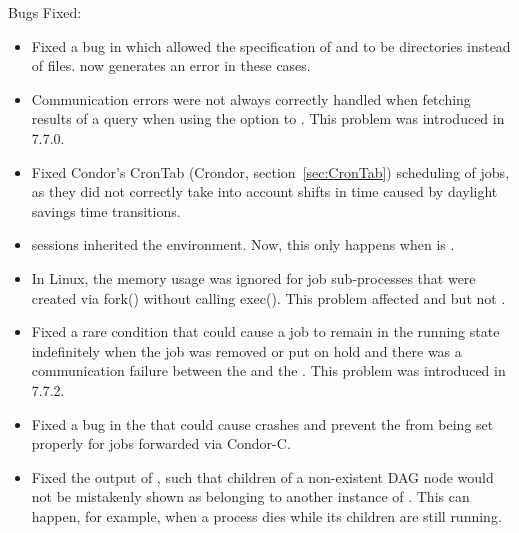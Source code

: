 \noindent Bugs Fixed:

\begin{itemize}

\item Fixed a bug in which  allowed the specification of
 and 
to be directories instead of files.
 now generates an error in these cases.

\item Communication errors were not always correctly handled when
fetching results of a query when using the  option to
.  This problem was introduced in 7.7.0.

\item Fixed Condor's CronTab (Crondor, section~\ref{sec:CronTab})
scheduling of jobs,
as they did not correctly take into account
shifts in time caused by daylight savings time transitions.

\item {} sessions inherited the 
environment.  Now, this only happens when
 is .

\item In Linux, the memory usage was ignored for job sub-processes
that were created via fork() without calling exec().  This problem
affected  and  but not
.

\item Fixed a rare condition that could cause a job to remain in the
running state indefinitely when the job was removed or put on hold
and there was a communication failure between the 
and the .  This problem was introduced in 7.7.2.

\item Fixed a bug in the  that could cause crashes
and prevent the  from being set properly for
jobs forwarded via Condor-C.

\item Fixed the output of  ,
such that children of a non-existent DAG node would not be mistakenly 
shown as belonging to another instance of .
This can happen, for example, when a  process dies while
its children are still running.


\end{itemize}

